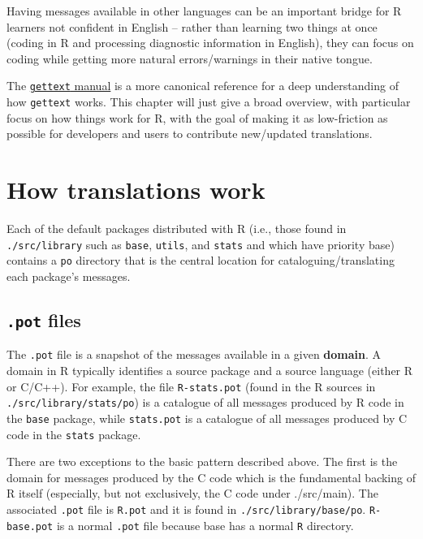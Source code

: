 \documentclass[
]{book}
\begin{document}
Having messages available in other languages can be an important bridge for R learners not confident in English --
rather than learning two things at once (coding in R and processing diagnostic information in English), they can
focus on coding while getting more natural errors/warnings in their native tongue.

The \href{https://www.gnu.org/software/gettext/manual/index.html}{\texttt{gettext} manual} is a more canonical reference for a
deep understanding of how \texttt{gettext} works. This chapter will just give a broad overview, with particular focus on
how things work for R, with the goal of making it as low-friction as possible for developers and users to contribute
new/updated translations.

\hypertarget{how-translations-work}{%
\section{How translations work}\label{how-translations-work}}

Each of the default packages distributed with R (i.e., those found in \texttt{./src/library} such as \texttt{base}, \texttt{utils},
and \texttt{stats} and which have priority base) contains a \texttt{po} directory that is the central location for cataloguing/translating each package's
messages.

\hypertarget{pot-files}{%
\subsection{\texorpdfstring{\texttt{.pot} files}{.pot files}}\label{pot-files}}

The \texttt{.pot} file is a snapshot of the messages available in a given \textbf{domain}. A domain in R typically identifies
a source package and a source language (either R or C/C++). For example, the file \texttt{R-stats.pot}
(found in the R sources in \texttt{./src/library/stats/po}) is a catalogue of all messages produced by R code in the
\texttt{base} package, while \texttt{stats.pot} is a catalogue of all messages produced by C code in the \texttt{stats} package.

There are two exceptions to the basic pattern described above. The first is the domain for messages produced by
the C code which is the fundamental backing of R itself (especially, but not exclusively, the C code under
./src/main). The associated \texttt{.pot} file is \texttt{R.pot} and it is found in \texttt{./src/library/base/po}. \texttt{R-base.pot} is a
normal \texttt{.pot} file because base has a normal \texttt{R} directory.
\end{document}
